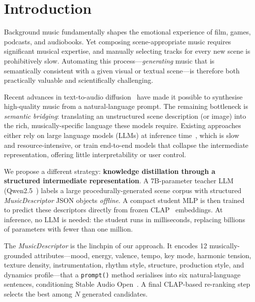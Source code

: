 \section{Introduction}
\label{sec:intro}

Background music fundamentally shapes the emotional experience of film, games,
podcasts, and audiobooks.
Yet composing scene-appropriate music requires significant musical expertise,
and manually selecting tracks for every new scene is prohibitively slow.
Automating this process---\emph{generating} music that is semantically
consistent with a given visual or textual scene---is therefore both practically
valuable and scientifically challenging.

Recent advances in text-to-audio diffusion~\cite{evans2024stable,
liu2023audioldm2, copet2023simple} have made it possible to synthesise
high-quality music from a natural-language prompt.
The remaining bottleneck is \emph{semantic bridging}: translating an
unstructured scene description (or image) into the rich, musically-specific
language these models require.
Existing approaches either rely on large language models (LLMs) at inference
time~\cite{liu2023audioldm2, agostinelli2023musiclm}, which is slow and
resource-intensive, or train end-to-end models that collapse the intermediate
representation, offering little interpretability or user control.

We propose a different strategy: \textbf{knowledge distillation through a
structured intermediate representation}.
A 7B-parameter teacher LLM (Qwen2.5~\cite{qwen2025qwen25}) labels a large
procedurally-generated scene corpus with structured \emph{MusicDescriptor}
JSON objects \emph{offline}.
A compact student MLP is then trained to predict these descriptors directly
from frozen CLAP~\cite{elizalde2023clap} embeddings.
At inference, no LLM is needed: the student runs in milliseconds, replacing
billions of parameters with fewer than one million.

The \emph{MusicDescriptor} is the linchpin of our approach.
It encodes 12 musically-grounded attributes---mood, energy, valence, tempo,
key mode, harmonic tension, texture density, instrumentation, rhythm style,
structure, production style, and dynamics profile---that a \texttt{prompt()}
method serialises into six natural-language sentences, conditioning
Stable Audio Open~\cite{evans2024stable}.
A final CLAP-based re-ranking step selects the best among $N$ generated
candidates.

